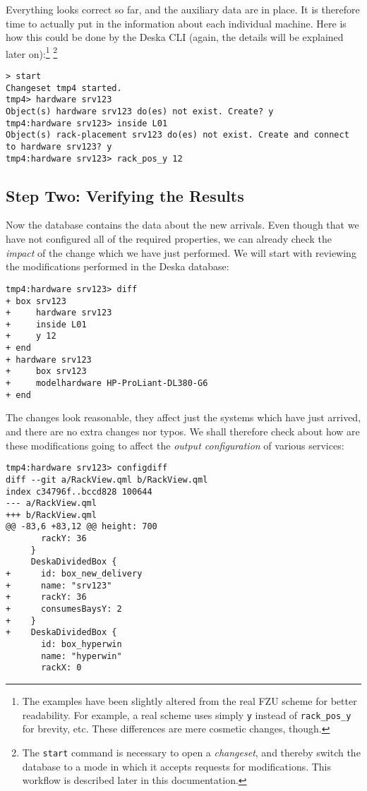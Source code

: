 \documentclass[deska]{subfiles}
\begin{document}
Everything looks correct so far, and the auxiliary data are in place.  It is therefore time to actually put in the
information about each individual machine.  Here is how this could be done by the Deska CLI (again, the details will be
explained later on):\footnote{The examples have been slightly altered from the real FZU scheme for better readability.
For example, a real scheme uses simply {\tt y} instead of {\tt rack\_pos\_y} for brevity, etc.  These differences are
mere cosmetic changes, though.} \footnote{The {\tt start} command is necessary to open a {\em changeset}, and thereby
switch the database to a mode in which it accepts requests for modifications.  This workflow is described later in this
documentation.}

\begin{verbatim}
> start
Changeset tmp4 started.
tmp4> hardware srv123
Object(s) hardware srv123 do(es) not exist. Create? y
tmp4:hardware srv123> inside L01
Object(s) rack-placement srv123 do(es) not exist. Create and connect to hardware srv123? y
tmp4:hardware srv123> rack_pos_y 12
\end{verbatim}

\subsection{Step Two: Verifying the Results}

Now the database contains the data about the new arrivals.  Even though that we have not configured all of the required
properties, we can already check the {\em impact} of the change which we have just performed.  We will start with
reviewing the modifications performed in the Deska database:

\begin{verbatim}
tmp4:hardware srv123> diff
+ box srv123
+     hardware srv123
+     inside L01
+     y 12
+ end
+ hardware srv123
+     box srv123
+     modelhardware HP-ProLiant-DL380-G6
+ end
\end{verbatim}

The changes look reasonable, they affect just the systems which have just arrived, and there are no extra changes nor
typos.  We shall therefore check about how are these modifications going to affect the {\em output configuration} of
various services:

\begin{verbatim}
tmp4:hardware srv123> configdiff
diff --git a/RackView.qml b/RackView.qml
index c34796f..bccd828 100644
--- a/RackView.qml
+++ b/RackView.qml
@@ -83,6 +83,12 @@ height: 700
       rackY: 36
     }
     DeskaDividedBox {
+      id: box_new_delivery
+      name: "srv123"
+      rackY: 36
+      consumesBaysY: 2
+    }
+    DeskaDividedBox {
       id: box_hyperwin
       name: "hyperwin"
       rackX: 0
\end{verbatim}
\end{document}
